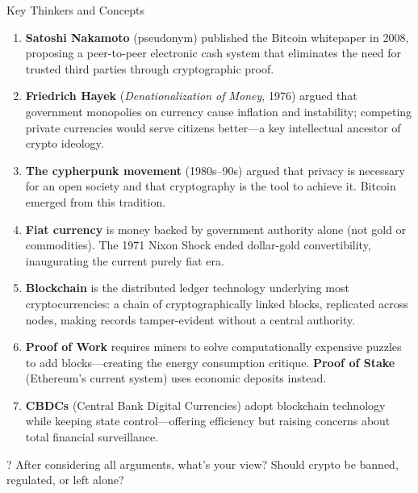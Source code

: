 ﻿\documentclass[aspectratio=169,11pt]{beamer}
\begin{document}
\begin{frame}[allowframebreaks]{Key Thinkers and Concepts}
\footnotesize
\begin{enumerate}
    \item \textbf{Satoshi Nakamoto} (pseudonym) published the Bitcoin whitepaper in 2008, proposing a peer-to-peer electronic cash system that eliminates the need for trusted third parties through cryptographic proof.
    \item \textbf{Friedrich Hayek} (\textit{Denationalization of Money}, 1976) argued that government monopolies on currency cause inflation and instability; competing private currencies would serve citizens better---a key intellectual ancestor of crypto ideology.
    \item \textbf{The cypherpunk movement} (1980s--90s) argued that privacy is necessary for an open society and that cryptography is the tool to achieve it. Bitcoin emerged from this tradition.
    \item \textbf{Fiat currency} is money backed by government authority alone (not gold or commodities). The 1971 Nixon Shock ended dollar-gold convertibility, inaugurating the current purely fiat era.
    \item \textbf{Blockchain} is the distributed ledger technology underlying most cryptocurrencies: a chain of cryptographically linked blocks, replicated across nodes, making records tamper-evident without a central authority.
    \item \textbf{Proof of Work} requires miners to solve computationally expensive puzzles to add blocks---creating the energy consumption critique. \textbf{Proof of Stake} (Ethereum's current system) uses economic deposits instead.
    \item \textbf{CBDCs} (Central Bank Digital Currencies) adopt blockchain technology while keeping state control---offering efficiency but raising concerns about total financial surveillance.
\end{enumerate}

\begin{alertblock}{?}
After considering all arguments, what's your view? Should crypto be banned, regulated, or left alone?
\end{alertblock}
\end{frame}
\end{document}
